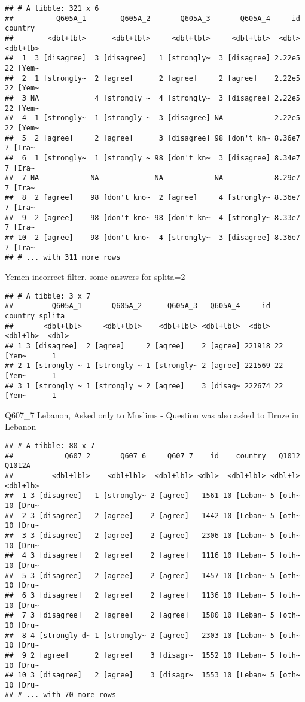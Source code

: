 \documentclass[]{article}
\begin{document}
\begin{verbatim}
## # A tibble: 321 x 6
##          Q605A_1        Q605A_2       Q605A_3       Q605A_4     id  country
##        <dbl+lbl>      <dbl+lbl>     <dbl+lbl>     <dbl+lbl>  <dbl> <dbl+lb>
##  1  3 [disagree]  3 [disagree]   1 [strongly~  3 [disagree] 2.22e5 22 [Yem~
##  2  1 [strongly~  2 [agree]      2 [agree]     2 [agree]    2.22e5 22 [Yem~
##  3 NA             4 [strongly ~  4 [strongly~  3 [disagree] 2.22e5 22 [Yem~
##  4  1 [strongly~  1 [strongly ~  3 [disagree] NA            2.22e5 22 [Yem~
##  5  2 [agree]     2 [agree]      3 [disagree] 98 [don't kn~ 8.36e7  7 [Ira~
##  6  1 [strongly~  1 [strongly ~ 98 [don't kn~  3 [disagree] 8.34e7  7 [Ira~
##  7 NA            NA             NA            NA            8.29e7  7 [Ira~
##  8  2 [agree]    98 [don't kno~  2 [agree]     4 [strongly~ 8.36e7  7 [Ira~
##  9  2 [agree]    98 [don't kno~ 98 [don't kn~  4 [strongly~ 8.33e7  7 [Ira~
## 10  2 [agree]    98 [don't kno~  4 [strongly~  3 [disagree] 8.36e7  7 [Ira~
## # ... with 311 more rows
\end{verbatim}

Yemen incorrect filter. some answers for splita=2

\begin{verbatim}
## # A tibble: 3 x 7
##         Q605A_1       Q605A_2      Q605A_3   Q605A_4     id  country splita
##       <dbl+lbl>     <dbl+lbl>    <dbl+lbl> <dbl+lbl>  <dbl> <dbl+lb>  <dbl>
## 1 3 [disagree]  2 [agree]     2 [agree]    2 [agree] 221918 22 [Yem~      1
## 2 1 [strongly ~ 1 [strongly ~ 1 [strongly~ 2 [agree] 221569 22 [Yem~      1
## 3 1 [strongly ~ 1 [strongly ~ 2 [agree]    3 [disag~ 222674 22 [Yem~      1
\end{verbatim}

Q607\_7 Lebanon, Asked only to Muslims - Question was also asked to
Druze in Lebanon

\begin{verbatim}
## # A tibble: 80 x 7
##            Q607_2       Q607_6     Q607_7    id    country   Q1012   Q1012A
##         <dbl+lbl>    <dbl+lbl>  <dbl+lbl> <dbl>  <dbl+lbl> <dbl+l> <dbl+lb>
##  1 3 [disagree]   1 [strongly~ 2 [agree]   1561 10 [Leban~ 5 [oth~ 10 [Dru~
##  2 3 [disagree]   2 [agree]    2 [agree]   1442 10 [Leban~ 5 [oth~ 10 [Dru~
##  3 3 [disagree]   2 [agree]    2 [agree]   2306 10 [Leban~ 5 [oth~ 10 [Dru~
##  4 3 [disagree]   2 [agree]    2 [agree]   1116 10 [Leban~ 5 [oth~ 10 [Dru~
##  5 3 [disagree]   2 [agree]    2 [agree]   1457 10 [Leban~ 5 [oth~ 10 [Dru~
##  6 3 [disagree]   2 [agree]    2 [agree]   1136 10 [Leban~ 5 [oth~ 10 [Dru~
##  7 3 [disagree]   2 [agree]    2 [agree]   1580 10 [Leban~ 5 [oth~ 10 [Dru~
##  8 4 [strongly d~ 1 [strongly~ 2 [agree]   2303 10 [Leban~ 5 [oth~ 10 [Dru~
##  9 2 [agree]      2 [agree]    3 [disagr~  1552 10 [Leban~ 5 [oth~ 10 [Dru~
## 10 3 [disagree]   2 [agree]    3 [disagr~  1553 10 [Leban~ 5 [oth~ 10 [Dru~
## # ... with 70 more rows
\end{verbatim}
\end{document}
